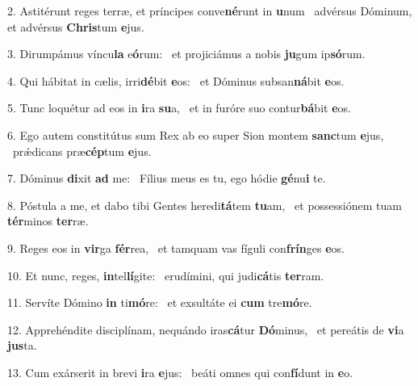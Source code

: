 2. Astitérunt reges terræ, et príncipes conve\textbf{né}runt in \textbf{u}num \ast\  advérsus Dóminum, et advérsus \textbf{Chris}tum \textbf{e}jus.\

3. Dirumpámus víncu\textbf{la} e\textbf{ó}rum: \ast\  et projiciámus a nobis \textbf{ju}gum ip\textbf{só}rum.\

4. Qui hábitat in cælis, irri\textbf{dé}bit \textbf{e}os: \ast\  et Dóminus subsan\textbf{ná}bit \textbf{e}os.\

5. Tunc loquétur ad eos in \textbf{i}ra \textbf{su}a, \ast\  et in furóre suo contur\textbf{bá}bit \textbf{e}os.\

6. Ego autem constitútus sum Rex ab eo super Sion montem \textbf{sanc}tum \textbf{e}jus, \ast\  prǽdicans præ\textbf{cép}tum \textbf{e}jus.\

7. Dóminus \textbf{di}xit \textbf{ad} me: \ast\  Fílius meus es tu, ego hódie \textbf{gé}nu\textbf{i} te.\

8. Póstula a me, et dabo tibi Gentes heredi\textbf{tá}tem \textbf{tu}am, \ast\  et possessiónem tuam \textbf{tér}minos \textbf{ter}ræ.\

9. Reges eos in \textbf{vir}ga \textbf{fér}rea, \ast\  et tamquam vas fíguli con\textbf{frín}ges \textbf{e}os.\

10. Et nunc, reges, \textbf{in}tel\textbf{lí}gite: \ast\  erudímini, qui judi\textbf{cá}tis \textbf{ter}ram.\

11. Servíte Dómino \textbf{in} ti\textbf{mó}re: \ast\  et exsultáte ei \textbf{cum} tre\textbf{mó}re.\

12. Apprehéndite disciplínam, nequándo iras\textbf{cá}tur \textbf{Dó}minus, \ast\  et pereátis de \textbf{vi}a \textbf{jus}ta.\

13. Cum exárserit in brevi \textbf{i}ra \textbf{e}jus: \ast\  beáti omnes qui con\textbf{fí}dunt in \textbf{e}o.\

